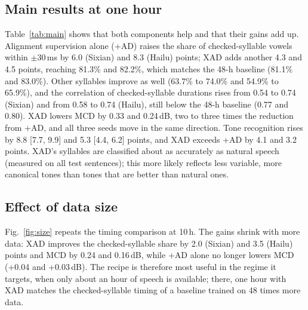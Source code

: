 \documentclass[conference,a4paper]{IEEEtran}
\begin{document}
\subsection{Main results at one hour}
Table~\ref{tab:main} shows that both components help and that their gains add up. Alignment supervision alone (+AD) raises the share of checked-syllable vowels within $\pm$30\,ms by 6.0 (Sixian) and 8.3 (Hailu) points; XAD adds another 4.3 and 4.5 points, reaching 81.3\% and 82.2\%, which matches the 48-h baseline (81.1\% and 83.0\%). Other syllables improve as well (63.7\% to 74.0\% and 54.9\% to 65.9\%), and the correlation of checked-syllable durations rises from 0.54 to 0.74 (Sixian) and from 0.58 to 0.74 (Hailu), still below the 48-h baseline (0.77 and 0.80). XAD lowers MCD by 0.33 and 0.24\,dB, two to three times the reduction from +AD, and all three seeds move in the same direction. Tone recognition rises by 8.8 [7.7, 9.9] and 5.3 [4.4, 6.2] points, and XAD exceeds +AD by 4.1 and 3.2 points. XAD's syllables are classified about as accurately as natural speech (measured on all test sentences); this more likely reflects less variable, more canonical tones than tones that are better than natural ones.



\subsection{Effect of data size}
Fig.~\ref{fig:size} repeats the timing comparison at 10\,h. The gains shrink with more data: XAD improves the checked-syllable share by 2.0 (Sixian) and 3.5 (Hailu) points and MCD by 0.24 and 0.16\,dB, while +AD alone no longer lowers MCD (+0.04 and +0.03\,dB). The recipe is therefore most useful in the regime it targets, when only about an hour of speech is available; there, one hour with XAD matches the checked-syllable timing of a baseline trained on 48 times more data.
\end{document}
